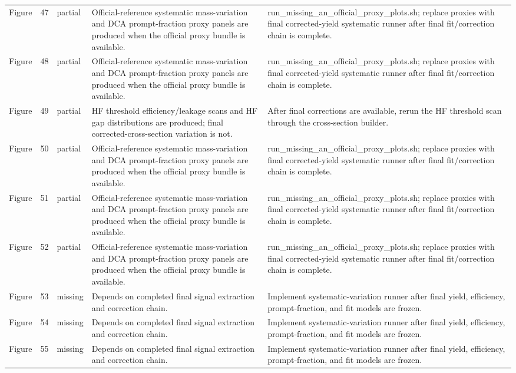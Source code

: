 \documentclass[11pt]{article}
\begin{document}
\begin{longtable}{lll p{} p{}}
Figure & 47 & partial & Official-reference systematic mass-variation and DCA prompt-fraction proxy panels are produced when the official proxy bundle is available. & run\_missing\_an\_official\_proxy\_plots.sh; replace proxies with final corrected-yield systematic runner after final fit/correction chain is complete. \\
Figure & 48 & partial & Official-reference systematic mass-variation and DCA prompt-fraction proxy panels are produced when the official proxy bundle is available. & run\_missing\_an\_official\_proxy\_plots.sh; replace proxies with final corrected-yield systematic runner after final fit/correction chain is complete. \\
Figure & 49 & partial & HF threshold efficiency/leakage scans and HF gap distributions are produced; final corrected-cross-section variation is not. & After final corrections are available, rerun the HF threshold scan through the cross-section builder. \\
Figure & 50 & partial & Official-reference systematic mass-variation and DCA prompt-fraction proxy panels are produced when the official proxy bundle is available. & run\_missing\_an\_official\_proxy\_plots.sh; replace proxies with final corrected-yield systematic runner after final fit/correction chain is complete. \\
Figure & 51 & partial & Official-reference systematic mass-variation and DCA prompt-fraction proxy panels are produced when the official proxy bundle is available. & run\_missing\_an\_official\_proxy\_plots.sh; replace proxies with final corrected-yield systematic runner after final fit/correction chain is complete. \\
Figure & 52 & partial & Official-reference systematic mass-variation and DCA prompt-fraction proxy panels are produced when the official proxy bundle is available. & run\_missing\_an\_official\_proxy\_plots.sh; replace proxies with final corrected-yield systematic runner after final fit/correction chain is complete. \\
Figure & 53 & missing & Depends on completed final signal extraction and correction chain. & Implement systematic-variation runner after final yield, efficiency, prompt-fraction, and fit models are frozen. \\
Figure & 54 & missing & Depends on completed final signal extraction and correction chain. & Implement systematic-variation runner after final yield, efficiency, prompt-fraction, and fit models are frozen. \\
Figure & 55 & missing & Depends on completed final signal extraction and correction chain. & Implement systematic-variation runner after final yield, efficiency, prompt-fraction, and fit models are frozen. \\

\end{longtable}
\end{document}
